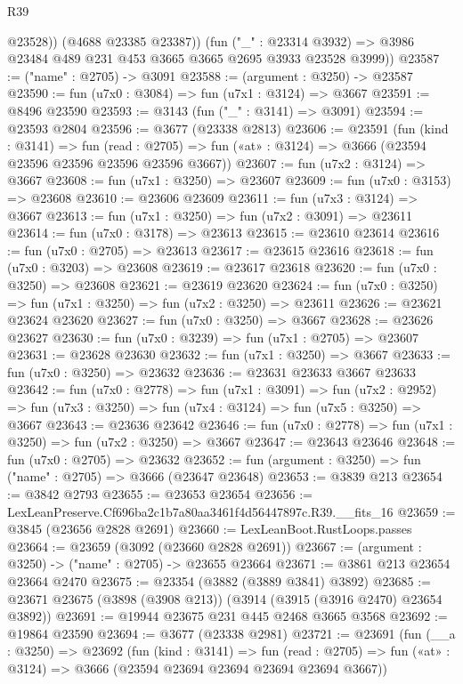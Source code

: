 \begin{lexlean}{R39}
\begin{coremodule}
            @23528))
        (@4688 @23385 @23387))
      (fun ("_" : @23314 @3932) =>
      @3986 @23484 @489 @231 @453 @3665 @3665 @2695 @3933 @23528 @3999))
@23587 := ("name" : @2705) -> @3091
@23588 := (argument : @3250) -> @23587
@23590 := fun (u7x0 : @3084) => fun (u7x1 : @3124) => @3667
@23591 := @8496 @23590
@23593 := @3143 (fun ("_" : @3141) => @3091)
@23594 := @23593 @2804
@23596 := @3677 (@23338 @2813)
@23606 := @23591
    (fun (kind : @3141) =>
    fun (read : @2705) => fun («at» : @3124) => @3666 (@23594 @23596 @23596 @23596 @23596 @3667))
@23607 := fun (u7x2 : @3124) => @3667
@23608 := fun (u7x1 : @3250) => @23607
@23609 := fun (u7x0 : @3153) => @23608
@23610 := @23606 @23609
@23611 := fun (u7x3 : @3124) => @3667
@23613 := fun (u7x1 : @3250) => fun (u7x2 : @3091) => @23611
@23614 := fun (u7x0 : @3178) => @23613
@23615 := @23610 @23614
@23616 := fun (u7x0 : @2705) => @23613
@23617 := @23615 @23616
@23618 := fun (u7x0 : @3203) => @23608
@23619 := @23617 @23618
@23620 := fun (u7x0 : @3250) => @23608
@23621 := @23619 @23620
@23624 := fun (u7x0 : @3250) => fun (u7x1 : @3250) => fun (u7x2 : @3250) => @23611
@23626 := @23621 @23624 @23620
@23627 := fun (u7x0 : @3250) => @3667
@23628 := @23626 @23627
@23630 := fun (u7x0 : @3239) => fun (u7x1 : @2705) => @23607
@23631 := @23628 @23630
@23632 := fun (u7x1 : @3250) => @3667
@23633 := fun (u7x0 : @3250) => @23632
@23636 := @23631 @23633 @3667 @23633
@23642 := fun (u7x0 : @2778) =>
  fun (u7x1 : @3091) =>
  fun (u7x2 : @2952) => fun (u7x3 : @3250) => fun (u7x4 : @3124) => fun (u7x5 : @3250) => @3667
@23643 := @23636 @23642
@23646 := fun (u7x0 : @2778) => fun (u7x1 : @3250) => fun (u7x2 : @3250) => @3667
@23647 := @23643 @23646
@23648 := fun (u7x0 : @2705) => @23632
@23652 := fun (argument : @3250) => fun ("name" : @2705) => @3666 (@23647 @23648)
@23653 := @3839 @213
@23654 := @3842 @2793
@23655 := @23653 @23654
@23656 := LexLeanPreserve.Cf696ba2c1b7a80aa3461f4d56447897c.R39.__fits_16
@23659 := @3845 (@23656 @2828 @2691)
@23660 := LexLeanBoot.RustLoops.passes
@23664 := @23659 (@3092 (@23660 @2828 @2691))
@23667 := (argument : @3250) -> ("name" : @2705) -> @23655 @23664
@23671 := @3861 @213 @23654 @23664 @2470
@23675 := @23354 (@3882 (@3889 @3841) @3892)
@23685 := @23671 @23675 (@3898 (@3908 @213)) (@3914 (@3915 (@3916 @2470) @23654 @3892))
@23691 := @19944 @23675 @231 @445 @2468 @3665 @3568
@23692 := @19864 @23590
@23694 := @3677 (@23338 @2981)
@23721 := @23691
    (fun (__a : @3250) =>
    @23692
      (fun (kind : @3141) =>
      fun (read : @2705) => fun («at» : @3124) => @3666 (@23594 @23694 @23694 @23694 @23694 @3667))

\end{coremodule}
\end{lexlean}

